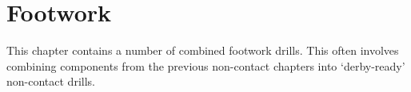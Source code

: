 \chapter{Footwork}
\label{ch:footwork}

This chapter contains a number of combined footwork drills.
This often involves combining components from the previous non-contact chapters into `derby-ready' non-contact drills.


